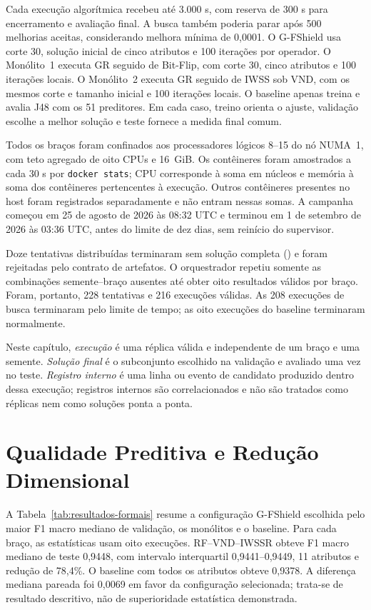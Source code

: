 Cada execução algorítmica recebeu até 3.000 s, com reserva de 300 s para encerramento e avaliação final. A busca também poderia parar após 500 melhorias aceitas, considerando melhora mínima de 0,0001. O G-FShield usa corte 30, solução inicial de cinco atributos e 100 iterações por operador. O Monólito~1 executa GR seguido de Bit-Flip, com corte 30, cinco atributos e 100 iterações locais. O Monólito~2 executa GR seguido de IWSS sob VND, com os mesmos corte e tamanho inicial e 100 iterações locais. O baseline apenas treina e avalia J48 com os 51 preditores. Em cada caso, treino orienta o ajuste, validação escolhe a melhor solução e teste fornece a medida final comum.

Todos os braços foram confinados aos processadores lógicos 8--15 do nó NUMA~1, com teto agregado de oito CPUs e 16~GiB. Os contêineres foram amostrados a cada 30 s por \texttt{docker stats}; CPU corresponde à soma em núcleos e memória à soma dos contêineres pertencentes à execução. Outros contêineres presentes no host foram registrados separadamente e não entram nessas somas. A campanha começou em 25 de agosto de 2026 às 08:32 UTC e terminou em 1 de setembro de 2026 às 03:36 UTC, antes do limite de dez dias, sem reinício do supervisor.

Doze tentativas distribuídas terminaram sem solução completa () e foram rejeitadas pelo contrato de artefatos. O orquestrador repetiu somente as combinações semente--braço ausentes até obter oito resultados válidos por braço. Foram, portanto, 228 tentativas e 216 execuções válidas. As 208 execuções de busca terminaram pelo limite de tempo; as oito execuções do baseline terminaram normalmente.

Neste capítulo, \emph{execução} é uma réplica válida e independente de um braço e uma semente. \emph{Solução final} é o subconjunto escolhido na validação e avaliado uma vez no teste. \emph{Registro interno} é uma linha ou evento de candidato produzido dentro dessa execução; registros internos são correlacionados e não são tratados como réplicas nem como soluções ponta a ponta.

\section{Qualidade Preditiva e Redução Dimensional}

A Tabela~\ref{tab:resultados-formais} resume a configuração G-FShield escolhida pelo maior F1 macro mediano de validação, os monólitos e o baseline. Para cada braço, as estatísticas usam oito execuções. RF--VND--IWSSR obteve F1 macro mediano de teste 0,9448, com intervalo interquartil 0,9441--0,9449, 11 atributos e redução de 78,4\%. O baseline com todos os atributos obteve 0,9378. A diferença mediana pareada foi 0,0069 em favor da configuração selecionada; trata-se de resultado descritivo, não de superioridade estatística demonstrada.

